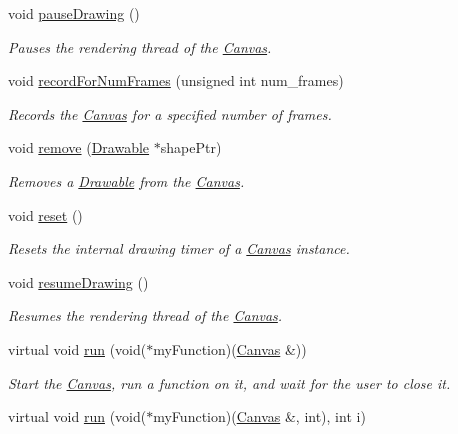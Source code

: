 \begin{DoxyCompactItemize}
void \hyperlink{classtsgl_1_1_canvas_abe021ab5148cc1327523689bced0f35a}{pause\+Drawing} ()
\begin{DoxyCompactList}\small\item\em Pauses the rendering thread of the \hyperlink{classtsgl_1_1_canvas}{Canvas}. \end{DoxyCompactList}\item 
void \hyperlink{classtsgl_1_1_canvas_a47436daa39473ddb4044bac7b3b27151}{record\+For\+Num\+Frames} (unsigned int num\+\_\+frames)
\begin{DoxyCompactList}\small\item\em Records the \hyperlink{classtsgl_1_1_canvas}{Canvas} for a specified number of frames. \end{DoxyCompactList}\item 
void \hyperlink{classtsgl_1_1_canvas_abcd9695030cb5718ebf8973b44180d33}{remove} (\hyperlink{classtsgl_1_1_drawable}{Drawable} $\ast$shape\+Ptr)
\begin{DoxyCompactList}\small\item\em Removes a \hyperlink{classtsgl_1_1_drawable}{Drawable} from the \hyperlink{classtsgl_1_1_canvas}{Canvas}. \end{DoxyCompactList}\item 
void \hyperlink{classtsgl_1_1_canvas_ada6403439b583910d27e497148da5f2e}{reset} ()
\begin{DoxyCompactList}\small\item\em Resets the internal drawing timer of a \hyperlink{classtsgl_1_1_canvas}{Canvas} instance. \end{DoxyCompactList}\item 
void \hyperlink{classtsgl_1_1_canvas_a56bf3c6e4eb7b06015d1c115aaa143f8}{resume\+Drawing} ()
\begin{DoxyCompactList}\small\item\em Resumes the rendering thread of the \hyperlink{classtsgl_1_1_canvas}{Canvas}. \end{DoxyCompactList}\item 
virtual void \hyperlink{classtsgl_1_1_canvas_a5f3f00d6c380a662a239077456045502}{run} (void($\ast$my\+Function)(\hyperlink{classtsgl_1_1_canvas}{Canvas} \&))
\begin{DoxyCompactList}\small\item\em Start the \hyperlink{classtsgl_1_1_canvas}{Canvas}, run a function on it, and wait for the user to close it. \end{DoxyCompactList}\item 
virtual void \hyperlink{classtsgl_1_1_canvas_a62ec8be88bea1905cdb6855138ef3cb1}{run} (void($\ast$my\+Function)(\hyperlink{classtsgl_1_1_canvas}{Canvas} \&, int), int i)

\end{DoxyCompactItemize}
